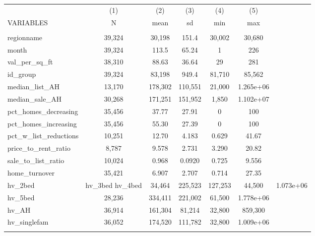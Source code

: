 \begin{tabular}{lccccc} \hline
 & (1) & (2) & (3) & (4) & (5) \\
VARIABLES & N & mean & sd & min & max \\ \hline
 &  &  &  &  &  \\
regionname & 39,324 & 30,198 & 151.4 & 30,002 & 30,680 \\
month & 39,324 & 113.5 & 65.24 & 1 & 226 \\
val\_per\_sq\_ft & 38,310 & 88.63 & 36.64 & 29 & 281 \\
id\_group & 39,324 & 83,198 & 949.4 & 81,710 & 85,562 \\
median\_list\_AH & 13,170 & 178,302 & 110,551 & 21,000 & 1.265e+06 \\
median\_sale\_AH & 30,268 & 171,251 & 151,952 & 1,850 & 1.102e+07 \\
pct\_homes\_decreasing & 35,456 & 37.77 & 27.91 & 0 & 100 \\
pct\_homes\_increasing & 35,456 & 55.30 & 27.39 & 0 & 100 \\
pct\_w\_list\_reductions & 10,251 & 12.70 & 4.183 & 0.629 & 41.67 \\
price\_to\_rent\_ratio & 8,787 & 9.578 & 2.731 & 3.290 & 20.82 \\
sale\_to\_list\_ratio & 10,024 & 0.968 & 0.0920 & 0.725 & 9.556 \\
home\_turnover & 35,421 & 6.907 & 2.707 & 0.714 & 27.35 \\
hv\_2bed & 
hv\_3bed 
hv\_4bed & 34,464 & 225,523 & 127,253 & 44,500 & 1.073e+06 \\
hv\_5bed & 28,236 & 334,411 & 221,002 & 61,500 & 1.778e+06 \\
hv\_AH & 36,914 & 161,304 & 81,214 & 32,800 & 859,300 \\
hv\_singlefam & 36,052 & 174,520 & 111,782 & 32,800 & 1.009e+06 \\


 &  &  &  &  &  \\ \hline
\end{tabular}
